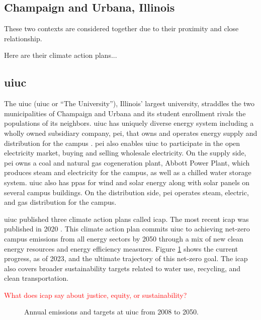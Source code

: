 \subsection{Champaign and Urbana, Illinois}
These two contexts are considered together due to their proximity and close
relationship. 

Here are their climate action plans...

\subsection{\acf{uiuc}} 

The \acl{uiuc} (\acs{uiuc} or ``The University''), Illinois' largest university,
straddles the two municipalities of Champaign and Urbana and its student
enrollment rivals the populations of its neighbors. \ac{uiuc} has uniquely
diverse energy system including a wholly owned subsidiary company, \ac{pei},
that owns and operates energy supply and distribution for the campus
\cite{affiliated_engineers_inc_utilities_2015}. \ac{pei} also enables \ac{uiuc}
to participate in the open electricity market, buying and selling wholesale
electricity. On the supply side, \ac{pei} owns a coal and natural gas
cogeneration plant, Abbott Power Plant, which produces steam and electricity for
the campus, as well as a chilled water storage system. \ac{uiuc} also has
\acp{ppa} for wind \cite{breitweiser_wind_2016} and solar energy
\cite{white_solar_2017, white_solar_2020} along with solar panels on several
campus buildings. On the distribution side, \ac{pei} operates steam, electric,
and gas distribution for the campus. 

\ac{uiuc} published three climate action plans called \ac{icap}. The most recent
\ac{icap} was published in 2020
\cite{institute_for_sustainability_energy_and_environment_illinois_2020}. This climate
action plan commits \ac{uiuc} to achieving net-zero campus emissions from all energy 
sectors by 2050 through a mix of new clean energy resources and energy efficiency 
measures. Figure \ref{fig:uiuc-emissions} shows the current progress,
as of 2023, and the ultimate trajectory of this net-zero goal. The \ac{icap} also covers
broader sustainability targets related to water use, recycling, and clean transportation.

\textcolor{red}{What does \ac{icap} say about justice, equity, or sustainability?}


\begin{figure}
    \centering
    \resizebox{0.75\columnwidth}{!}{}
    \caption{Annual emissions and targets at \ac{uiuc} from 2008 to 2050.}
    \label{fig:uiuc-emissions}
\end{figure}

